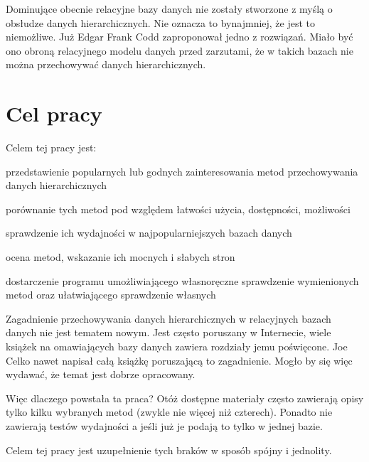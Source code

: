 Dominujące obecnie relacyjne bazy danych nie zostały stworzone z myślą o obsłudze danych hierarchicznych.
Nie oznacza to bynajmniej, że jest to niemożliwe.
Już Edgar Frank Codd zaproponował jedno z rozwiązań.
Miało być ono obroną relacyjnego modelu danych przed zarzutami,
że w takich bazach nie można przechowywać danych hierarchicznych.



\section{Cel pracy}






Celem tej pracy jest:
\begin{itemize*}
    \item przedstawienie popularnych lub godnych zainteresowania metod przechowywania danych hierarchicznych
    \item porównanie tych metod pod względem łatwości użycia, dostępności, możliwości
    \item sprawdzenie ich wydajności w najpopularniejszych bazach danych
    \item ocena metod, wskazanie ich mocnych i słabych stron
    \item dostarczenie programu umożliwiającego własnoręczne sprawdzenie wymienionych metod
        oraz ułatwiającego sprawdzenie własnych
\end{itemize*}


Zagadnienie przechowywania danych hierarchicznych w relacyjnych bazach danych nie jest tematem nowym.
Jest często poruszany w Internecie,
wiele książek na omawiających bazy danych zawiera rozdziały jemu poświęcone.
Joe Celko nawet napisał całą książkę poruszającą to zagadnienie\cite{celko-tree}.
Mogło by się więc wydawać, że temat jest dobrze opracowany.

Więc dlaczego powstała ta praca?
Otóż dostępne materiały często zawierają opisy tylko kilku wybranych metod (zwykle nie więcej niż czterech).
Ponadto nie zawierają testów wydajności a jeśli już je podają to tylko w jednej bazie.

Celem tej pracy jest uzupełnienie tych braków w sposób spójny i jednolity.










